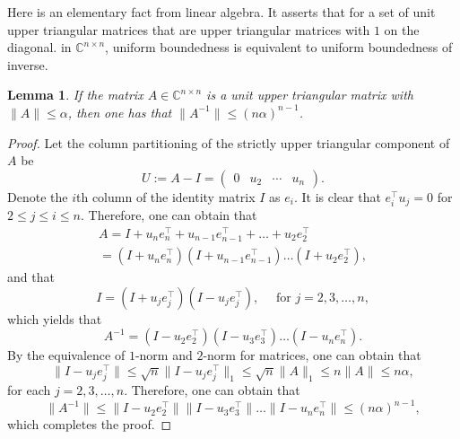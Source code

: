 \documentclass{article}
\theoremstyle{plain}%
\newtheorem{lemma}{Lemma}%
\theoremstyle{definition}%
\theoremstyle{remark}%
\newcommand{\bC}{\mathbb{C}}
\newcommand{\+}[1]{{\bm{#1}}}
\newcommand{\norm}[1]{\|{#1}\|}
\begin{document}
Here is an elementary fact from linear algebra. It asserts that 
for a set of unit upper triangular matrices that are upper 
triangular matrices with $1$ on the diagonal.
in $\bC^{n \times n}$, uniform boundedness is equivalent to uniform 
boundedness of inverse.
\begin{lemma}\label{lemma:unittri}
  If the matrix $A \in \bC^{n \times n}$ is a unit upper triangular 
  matrix with $\norm{A} \le \alpha$, then one has that 
  $\norm{A^{-1}} \le (n \alpha)^{n - 1}$.
\end{lemma}
\begin{proof}
  Let the column partitioning of the strictly upper triangular 
  component of $A$ be 
  \begin{displaymath}
    U := A - I = \begin{pmatrix}
      0 & u_2 & \cdots & u_n
    \end{pmatrix}.
  \end{displaymath}
  Denote the $i$th column of the identity matrix $I$ as $e_i$.
  It is clear that $e_i^\top u_j = 0$ for $2 \le j \le i \le n$.
  Therefore, one can obtain that 
  \begin{multline*}
    A = I + u_n e_n^\top + u_{n - 1} e_{n - 1}^\top + 
    \ldots + u_2 e_2^\top \\ = \left( I + u_n e_n^\top \right) 
    \left( I + u_{n - 1} e_{n - 1}^\top \right)
    \ldots \left( I + u_2 e_2^\top \right),
  \end{multline*}
  and that 
  \begin{displaymath}
    I = \left( I + u_j e_j^\top \right) 
    \left( I - u_j e_j^\top \right), \quad 
    \text{ for } j = 2, 3, \ldots, n,
  \end{displaymath}
  which yields that 
  \begin{displaymath}
    A^{-1} = \left( I - u_2 e_2^\top \right)
    \left( I - u_3 e_3^\top \right) \ldots 
    \left( I - u_n e_n^\top \right).
  \end{displaymath}
  By the equivalence of $1$-norm and $2$-norm for matrices, one can 
  obtain that
  \begin{displaymath}
    \norm{I - u_j e_j^\top} \le \sqrt{n} \norm{I - u_j e_j^\top}_1 
    \le \sqrt{n} \norm{A}_1 \le n \norm{A} \le n \alpha, 
  \end{displaymath}
  for each $j = 2, 3, \ldots, n$.
  Therefore, one can obtain that 
  \begin{displaymath}
    \norm{A^{-1}} \le \norm{I - u_2 e_2^\top}
    \norm{I - u_3 e_3^\top} \ldots 
    \norm{I - u_n e_n^\top} \le (n \alpha)^{n - 1},
  \end{displaymath}
  which completes the proof.
\end{proof}
\end{document}
